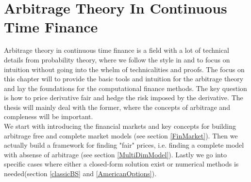 
\chapter{Arbitrage Theory In Continuous Time Finance} %

\label{Chapter2} %

Arbitrage theory in continuous time finance is a field with a lot of technical details from probability theory, where we follow the style in \parencite{Hull} and \parencite{finKont} to focus on intuition without going into the whelm of technicalities and proofs. The focus on this chapter will to provide the basic tools and intuition for the arbitrage theory and lay the foundations for the computational finance methods. The key question is how to price derivative fair and hedge the risk imposed by the derivative. The thesis will mainly deal with the former, where the concepts of arbitrage and compleness will be important.\\

We start with introducing the financial markets and key concepts for building arbitrage free and complete market models (see section \ref{FinMarket}). Then we actually build a framework for finding "fair" prices, i.e. finding a complete model with absense of arbitrage (see section \ref{MultiDimModel}). Lastly we go into specific cases where either a closed-form solution exist or numerical methods is needed(section \ref{classicBS} and \ref{AmericanOptions}).


